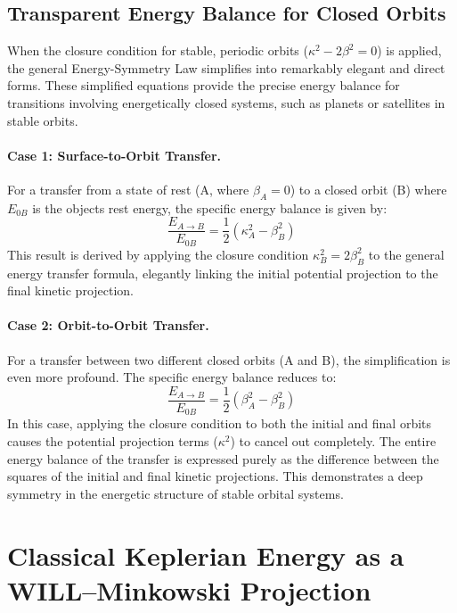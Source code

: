 \documentclass[12pt, a4paper]{article}
\begin{document}
\subsection{Transparent Energy Balance for Closed Orbits}

When the closure condition for stable, periodic orbits ($\kappa^2 - 2\beta^2 = 0$) is applied, the general Energy-Symmetry Law simplifies into remarkably elegant and direct forms. These simplified equations provide the precise energy balance for transitions involving energetically closed systems, such as planets or satellites in stable orbits.

\paragraph{Case 1: Surface-to-Orbit Transfer.}
For a transfer from a state of rest (A, where $\beta_A = 0$) to a closed orbit (B) where $E_{0B}$ is the objects rest energy, the specific energy balance is given by:
\begin{equation}
\frac{E_{A \to B}}{E_{0B}} = \frac{1}{2}(\kappa_A^2 - \beta_B^2)
\end{equation}
This result is derived by applying the closure condition $\kappa_B^2 = 2\beta_B^2$ to the general energy transfer formula, elegantly linking the initial potential projection to the final kinetic projection.

\paragraph{Case 2: Orbit-to-Orbit Transfer.}
For a transfer between two different closed orbits (A and B), the simplification is even more profound. The specific energy balance reduces to:
\begin{equation}
\frac{E_{A \to B}}{E_{0B}} = \frac{1}{2}(\beta_A^2 - \beta_B^2)
\end{equation}
In this case, applying the closure condition to both the initial and final orbits causes the potential projection terms ($\kappa^2$) to cancel out completely. The entire energy balance of the transfer is expressed purely as the difference between the squares of the initial and final kinetic projections. This demonstrates a deep symmetry in the energetic structure of stable orbital systems.


\section{Classical Keplerian Energy as a WILL--Minkowski Projection}
\end{document}
